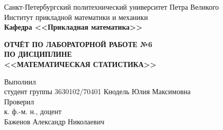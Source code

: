 \begin{titlepage}
\begin{center}
	\begin{large}
		Санкт-Петербургский политехнический университет Петра Великого\\
		Институт прикладной математики и механики\\
		\textbf{Кафедра <<Прикладная математика>>}\\
	\end{large}
	\vfill
	\Large{\textbf{ОТЧЁТ ПО ЛАБОРАТОРНОЙ РАБОТЕ №6\\
	ПО ДИСЦИПЛИНЕ \\
	<<МАТЕМАТИЧЕСКАЯ СТАТИСТИКА>>}}
\end{center}
\vfill
\flushleft
Выполнил\\
студент группы 3630102/70401
\flushright
Кнодель Юлия Максимовна\\
\flushleft
Проверил\\
к. ф.-м. н., доцент\\
\flushright
Баженов Александр Николаевич
\vfill
{}
\end{titlepage}